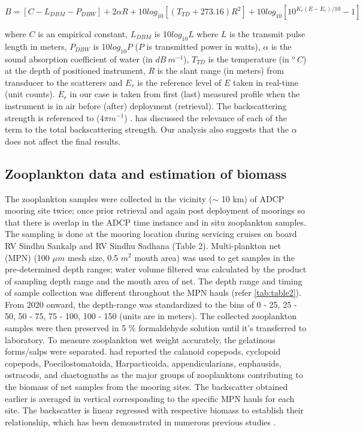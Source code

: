 \documentclass{article}
\begin{document}
	$B = [C - L_{DBM}-P_{DBW}] + 2\alpha R + {10 log_{10}[(T_{TD}+273.16)R^2] } + {10log_{10} [10^{K_c(E-E_r)/10}-1]}$
	
	where $C$ is an empirical constant, $L_{DBM}$ is 10$log_{10}L$ where $L$ is the transmit pulse length in meters, $P_{DBW}$ is 10$log_{10}P$ ($P$ is  transmitted power in watts), $\alpha$ is the sound absorption coefficient of water (in $dB\ m^{-1}$),  $T_{TD}$ is the temperature (in $^o\ C$) at the depth of positioned instrument, $R$  is the slant range (in meters) from transducer to the scatterers and $E_r$ is	the reference level of $E$ taken in real-time (unit counts). $E_r$ in our case is taken from first (last) measured profile when the instrument is in air before (after) deployment (retrieval). The backscattering strength is referenced to ($4\pi m^{-1}$) \citep{deines1999backscatter, mullison2017backscatter}.  \citet{aparna2022seasonal} has discussed the relevance of each of the term to the total backscattering strength. Our analysis also suggests that the $\alpha$ does not affect the final results. 
	
	\subsection{Zooplankton data and estimation of biomass}
	The  zooplankton  samples were collected in the vicinity ($\sim$ 10 km) of ADCP mooring site twice; once prior retrieval and again post deployment of moorings so that there is overlap in the ADCP time instance and in situ zooplankton samples. The sampling is done at the mooring location during servicing cruises on board RV Sindhu Sankalp and RV Sindhu Sadhana (Table 2). Multi-plankton net (MPN) (100 $\mu m$ mesh size, 0.5 $m^2$ mouth area) was used to get samples in the pre-determined depth ranges; water volume filtered was calculated by the product of sampling depth range and the mouth area of net. The depth range and timing of sample collection was different throughout the MPN hauls (refer \autoref{tab:table2}). From 2020 onward, the depth-range was standardized to the bins of 0 - 25, 25 - 50, 50 - 75, 75 - 100, 100 - 150 (units are in meters). The collected zooplankton samples were then preserved in 5 \% formaldehyde solution until it's transferred to laboratory. To measure zooplankton wet weight accurately, the gelatinous forms/salps were separated. \citep{aparna2022seasonal} had reported the calanoid copepods, cyclopoid copepods, Poecilostomatoida, Harpacticoida, appendicularians, euphausids, ostracods, and
	chaetognaths as the major groups of zooplanktons contributing to the biomass of net samples from the mooring sites. 
	The backscatter obtained earlier is averaged in vertical corresponding to the specific MPN hauls for each site. The backscatter is linear regressed with respective biomass to establish their relationship, which has been demonstrated in numerous previous studies \citep{flagg1989use,heywood1991estimation,jiang2007temporal,aparna2022seasonal}. 
	
\end{document}

